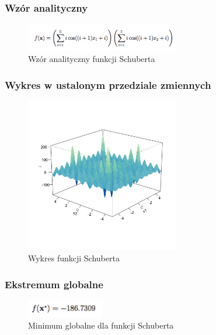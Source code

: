 \documentclass{article}
\begin{document}
	\subsubsection{Wzór analityczny}
	   \begin{figure}[!htbp]
    \centering
    \includegraphics[width=0.6\textwidth]{inc/wzory/schubert}
     \caption{Wzór analityczny funkcji Schuberta}
    \end{figure}
    
    

    \subsubsection{Wykres w ustalonym przedziale zmiennych}
    
    \begin{figure}[!htbp]
    \centering
    \includegraphics[width=0.6\textwidth]{inc/wykresyfunkcji/schubert}
     \caption{Wykres  funkcji Schuberta}
    \end{figure}
    
   

    \subsubsection{Ekstremum globalne}
    
       \begin{figure}[!htbp]
    \centering
    \includegraphics[width=0.3\textwidth]{inc/wzory/schubert-global-minimum}
     \caption{Minimum globalne dla funkcji Schuberta}
    \end{figure}
    
\end{document}
